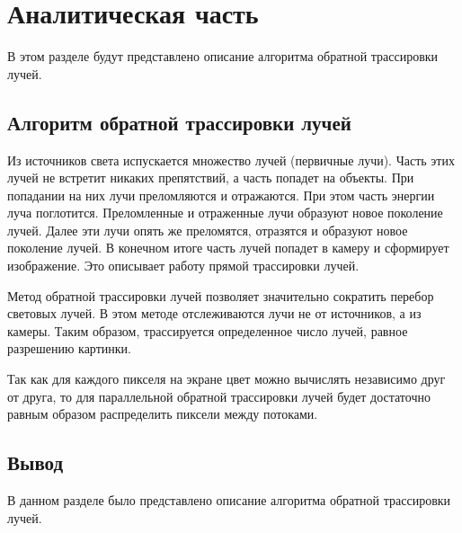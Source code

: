\chapter{Аналитическая часть}
В этом разделе будут представлено описание алгоритма обратной трассировки лучей.

\section{Алгоритм обратной трассировки лучей}
Из источников света испускается множество лучей (первичные лучи). Часть этих лучей не встретит никаких препятствий, а часть попадет на объекты. При попадании на них лучи преломляются и отражаются. При этом часть энергии луча поглотится. Преломленные и отраженные лучи образуют новое поколение лучей. Далее эти лучи опять же преломятся, отразятся и образуют новое поколение лучей. В конечном итоге часть лучей попадет в камеру и сформирует изображение. Это описывает работу прямой трассировки лучей. 

Метод обратной трассировки лучей позволяет значительно сократить перебор световых лучей. В этом методе отслеживаются лучи не от источников, а из камеры. Таким образом, трассируется определенное число лучей, равное разрешению картинки.

Так как для каждого пикселя на экране цвет можно вычислять независимо друг от друга, то для параллельной обратной трассировки лучей будет достаточно равным образом распределить пиксели между потоками.

\section*{Вывод}

В данном разделе было представлено описание алгоритма обратной трассировки лучей. 



